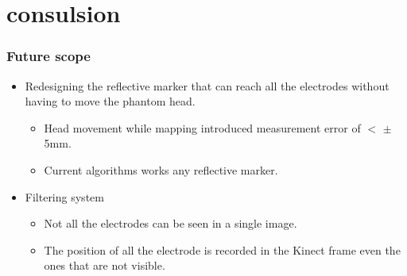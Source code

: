 \section{consulsion}
\begin{frame}
	\frametitle{Future scope}
	\begin{itemize}
		\item Redesigning the reflective marker that can reach all the electrodes without having to move the phantom
		head.
			\begin{itemize}
				\item Head movement while mapping introduced measurement error of $<$ $\pm$ 5mm.
				\item Current algorithms works any reflective marker.
			\end{itemize}
		\item Filtering system
			\begin{itemize}
				\item Not all the electrodes can be seen in a single image.
				\item The position of all the electrode
				is recorded in the Kinect frame even the ones that are not visible.
			\end{itemize}
	\end{itemize}
\end{frame}